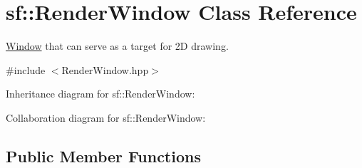 \hypertarget{classsf_1_1_render_window}{}\section{sf\+:\+:Render\+Window Class Reference}
\label{classsf_1_1_render_window}


\hyperlink{classsf_1_1_window}{Window} that can serve as a target for 2D drawing.  




{\ttfamily \#include $<$Render\+Window.\+hpp$>$}



Inheritance diagram for sf\+:\+:Render\+Window\+:


Collaboration diagram for sf\+:\+:Render\+Window\+:
\subsection*{Public Member Functions}
